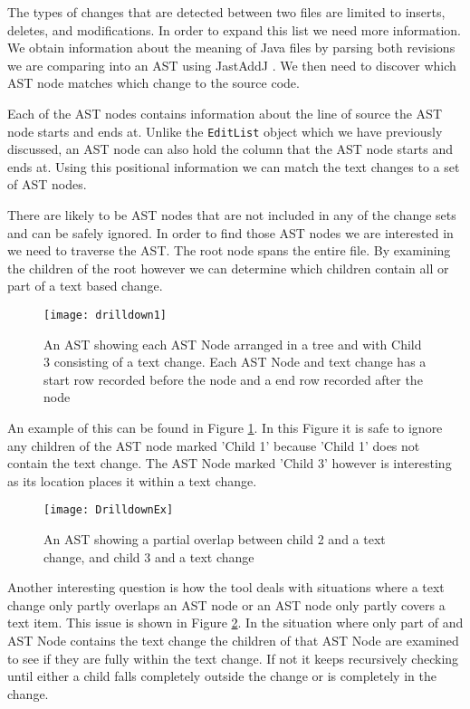 The types of changes that are detected between two files are limited to inserts, deletes, and modifications. In order to expand this list we need more information.  We obtain information about the meaning of Java files by parsing both revisions we are comparing into an AST using JastAddJ \cite{Oqvist2013}. We then need to discover which AST node matches which change to the source code. 

Each of the AST nodes contains information about the line of source the AST node starts and ends at.  Unlike the \lstinline{EditList} object which we have previously discussed, an AST node can also hold the column that the AST node starts and ends at.  Using this positional information we can match the text changes to a set of AST nodes.

There are likely to be AST nodes that are not included in any of the change sets and can be safely ignored. In order to find those AST nodes we are interested in we need to traverse the AST.  The root node spans the entire file.  By examining the children of the root however we can determine which children contain all or part of a text based change.

\begin{figure}[!t]
 \begin{center}
  \texttt{[image: drilldown1]}
 \end{center}
 \caption{An AST showing each AST Node arranged in a tree and with Child 3 consisting of a text change.  Each AST Node and text change has a start row recorded before the node and a end row recorded after the node}
 \label{fig:findingASTNode}
\end{figure}

An example of this can be found in Figure \ref{fig:findingASTNode}.  In this Figure it is safe to ignore any children of the AST node marked 'Child 1' because 'Child 1' does not contain the text change.  The AST Node marked 'Child 3' however is interesting as its location places it within a text change. 


\begin{figure}[!t]
 \begin{center}
  \texttt{[image: DrilldownEx]}
 \end{center}
 \caption{An AST showing a partial overlap between child 2 and a text change, and child 3 and a text change}
 \label{fig:troubleASTNode}
\end{figure}

Another interesting question is how the tool deals with situations where a text change only partly overlaps an AST node or an AST node only partly covers a text item.  This issue is shown in Figure \ref{fig:troubleASTNode}. In the situation where only part of and AST Node contains the text change the children of that AST Node are examined to see if they are fully within the text change.  If not it keeps recursively checking until either a child falls completely outside the change or is completely in the change.  

